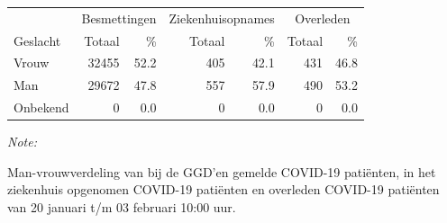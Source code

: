 \documentclass[
  english,
  man,floatsintext]{apa6}
\begin{document}
\begin{table}[H]
\centering\begingroup\fontsize{11}{13}\selectfont

\begin{threeparttable}
\begin{tabular}{lrrrrrr}
\toprule
\multicolumn{1}{c}{ } & \multicolumn{2}{c}{Besmettingen} & \multicolumn{2}{c}{Ziekenhuisopnames} & \multicolumn{2}{c}{Overleden} \\
\cmidrule(l{3pt}r{3pt}){2-3} \cmidrule(l{3pt}r{3pt}){4-5} \cmidrule(l{3pt}r{3pt}){6-7}
Geslacht & Totaal & \% & Totaal & \% & Totaal & \%\\
\midrule
Vrouw & 32455 & 52.2 & 405 & 42.1 & 431 & 46.8\\
Man & 29672 & 47.8 & 557 & 57.9 & 490 & 53.2\\
Onbekend & 0 & 0.0 & 0 & 0.0 & 0 & 0.0\\
\bottomrule
\end{tabular}
\begin{tablenotes}
\item \textit{Note: } 
\item Man-vrouwverdeling van bij de GGD’en gemelde COVID-19 patiënten, in het ziekenhuis opgenomen COVID-19 patiënten en overleden COVID-19 patiënten van 20 januari t/m 03 februari 10:00 uur.
\end{tablenotes}
\end{threeparttable}
\endgroup{}
\end{table}
\newpage
\end{document}
